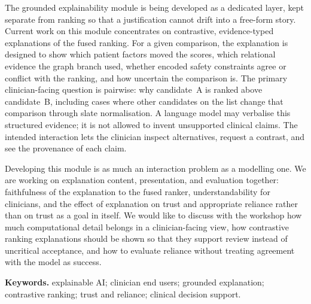 \documentclass[11pt,a4paper]{article}
\begin{document}
The grounded explainability module is being developed as a dedicated layer, kept separate from ranking so that a justification cannot drift into a free-form story. Current work on this module concentrates on contrastive, evidence-typed explanations of the fused ranking. For a given comparison, the explanation is designed to show which patient factors moved the scores, which relational evidence the graph branch used, whether encoded safety constraints agree or conflict with the ranking, and how uncertain the comparison is. The primary clinician-facing question is pairwise: why candidate~A is ranked above candidate~B, including cases where other candidates on the list change that comparison through slate normalisation. A language model may verbalise this structured evidence; it is not allowed to invent unsupported clinical claims. The intended interaction lets the clinician inspect alternatives, request a contrast, and see the provenance of each claim.

Developing this module is as much an interaction problem as a modelling one. We are working on explanation content, presentation, and evaluation together: faithfulness of the explanation to the fused ranker, understandability for clinicians, and the effect of explanation on trust and appropriate reliance rather than on trust as a goal in itself. We would like to discuss with the workshop how much computational detail belongs in a clinician-facing view, how contrastive ranking explanations should be shown so that they support review instead of uncritical acceptance, and how to evaluate reliance without treating agreement with the model as success.

\vspace{0.35em}
{\small\bfseries Keywords.}
explainable AI; clinician end users; grounded explanation; contrastive ranking; trust and reliance; clinical decision support.
\end{document}
